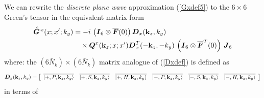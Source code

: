 \documentclass[11pt,a4paper]{article}
\newcommand{\bmi}[1]{\mbox{\boldmath$\mit #1$\unboldmath}}
\newcommand{\rf}[1]{\stackrel{\scriptscriptstyle _{\,\,\circ}}{ #1}}
\begin{document}
We can  rewrite the {\em discrete plane wave\/}
approximation (\ref{Gxdef5}) to the $6 \times 6$ Green's tensor in the equivalent matrix
form
\begin{align} \label{superGx}
\rf{\bmi G}\!{}^{x}({ x};{ x}^{\prime};k_y)
&=- i\,
\left({\bmi I}_6\otimes \overline{\bmi F}(0)  \right)
 {\bmi  D}_{x}({\bf k}_{z},{k}_{y})\nonumber\\
&\quad\times
{\bmi Q}^{x}({\bf k}_{z};x;x^{\prime}){\bmi  D}_{x}^{T}(-{\bf k}_{z},-{k}_{y})
\,\left({\bmi I}_6\otimes \overline{\bmi F}^{T}(0)  \right)\,{\bmi  J}_6
\end{align}
where:\newline
the $(6\bar{N}_k)\times (6\bar{N}_k)$ matrix analogue of (\ref{Dxdef}) is defined
as
\begin{equation} \label{Dxsuperdef}
{\bmi D}_{x}({\bf k}_{z},k_{y})=\left[\begin{array}{cccccc}
\overline{\left|+,P, {\bf k}_{z},k_{y}  \right\rangle}&\overline{\left|+,S, {\bf k}_{z},k_{y}
\right\rangle}&\overline{\left|+,H, {\bf k}_{z},k_{y}  \right\rangle}&
\overline{\left|-,P, {\bf k}_{z},k_{y}  \right\rangle}&\overline{\left|-,S, {\bf k}_{z},k_{y}
\right\rangle}&\overline{\left|-,H, {\bf k}_{z},k_{y}  \right\rangle}
\end{array}\right]
\end{equation}
in terms of
\end{document}
